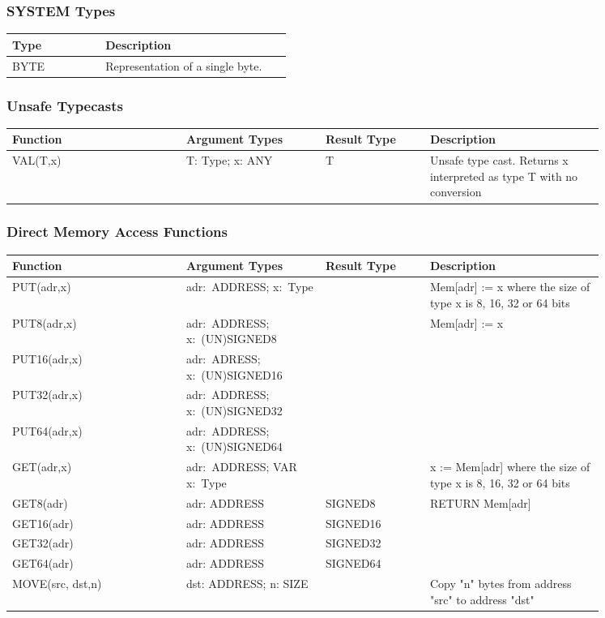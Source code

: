 \documentclass[a4wide,11pt]{article}
\begin{document}
\subsubsection{SYSTEM Types}
\begin{longtable}{|p{0.3\linewidth}|p{0.6\linewidth}|}
\hline
Type & Description \\
\hline\hline
\endhead
BYTE & Representation of a single byte.\\
\hline
\end{longtable}

\subsubsection{Unsafe Typecasts}
\begin{longtable}{|p{0.25\linewidth}|p{0.2\linewidth}|p{0.15\linewidth}|p{0.25\linewidth}|}

\hline
Function & Argument Types & Result Type & Description \\
\hline\hline
\endhead
VAL(T,x) & T: Type; x: ANY & T & Unsafe type cast. Returns x interpreted as type T with no conversion \\
\hline
\end{longtable}

\subsubsection{Direct Memory Access Functions}
\begin{longtable}{|p{0.25\linewidth}|p{0.2\linewidth}|p{0.15\linewidth}|p{0.25\linewidth}|}

\hline
Function & Argument Types & Result Type & Description \\
\hline\hline
\endhead
PUT(adr,x) & adr:~ADDRESS; x:~Type & & Mem[adr] := x where the size of type x is 8, 16, 32 or 64 bits \\
\hline
PUT8(adr,x) & adr:~ADDRESS; x:~(UN)SIGNED8 & & Mem[adr] := x \\
PUT16(adr,x) & adr:~ADRESS; x:~(UN)SIGNED16 && \\
PUT32(adr,x) & adr:~ADDRESS; x:~(UN)SIGNED32 && \\
PUT64(adr,x) & adr:~ADDRESS; x:~(UN)SIGNED64 && \\
\hline
GET(adr,x) & adr:~ADDRESS; VAR x:~Type & & x := Mem[adr] where the size of type x is 8, 16, 32 or 64 bits \\
\hline
GET8(adr) & adr: ADDRESS & SIGNED8 & RETURN Mem[adr] \\
GET16(adr) & adr: ADDRESS & SIGNED16 &\\
GET32(adr) & adr: ADDRESS & SIGNED32 & \\
GET64(adr) & adr: ADDRESS & SIGNED64 & \\
\hline
MOVE(src, dst,n) & dst: ADDRESS; n: SIZE & & Copy "n" bytes from address "src" to address "dst" \\
\hline \end{longtable}
\end{document}
